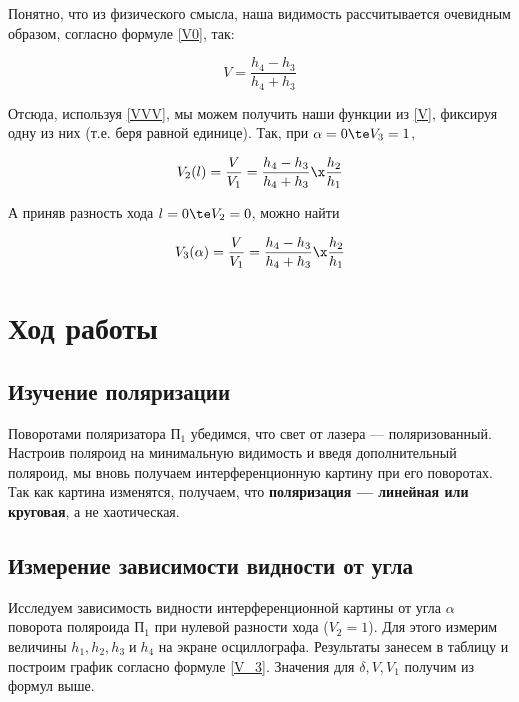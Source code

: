 \documentclass[12pt]{kiarticle}
\begin{document}
Понятно, что из физического смысла, наша видимость рассчитывается очевидным образом, согласно формуле \eqref{V0}, так:

\begin{equation}\label{V}
V = \dfrac{h_4 - h_3}{h_4 + h_3}
\end{equation}

Отсюда, используя \eqref{VVV}, мы можем получить наши функции из \eqref{V}, фиксируя одну из них (т.е. беря равной единице). Так, при $ \alpha = 0 \te V_3 = 1 $, 

\begin{equation}\label{V2}
V_2 (l) = \dfrac{V}{V_1} = \dfrac{h_4 - h_3}{h_4 + h_3} \x \dfrac{h_2}{h_1}
\end{equation}

А приняв разность хода $ l = 0 \te V_2 = 0 $, можно найти 

\begin{equation}\label{V_3}
V_3(\alpha) = \dfrac{V}{V_1} = \dfrac{h_4 - h_3}{h_4 + h_3} \x \dfrac{h_2}{h_1}
\end{equation}

\section{Ход работы}

\subsection{Изучение поляризации}

Поворотами поляризатора $ П_1 $ убедимся, что свет от лазера --- поляризованный. Настроив поляроид на минимальную видимость и введя дополнительный поляроид, мы вновь получаем интерференционную картину при его поворотах. Так как картина изменятся, получаем, что \textbf{поляризация --- линейная или круговая}, а не хаотическая.

\subsection{Измерение зависимости видности от угла}

Исследуем зависимость видности интерференционной картины от угла
$ \alpha $ поворота поляроида $ П_1 $ при нулевой разности хода ($ V_2 = 1 $). Для этого измерим величины $ h_1, h_2, h_3 \; и \; h_4 $ на экране осциллографа. Результаты занесем в таблицу и построим график согласно формуле \eqref{V_3}. Значения для $ \delta, V, V_1 $ получим из формул выше.
\end{document}
